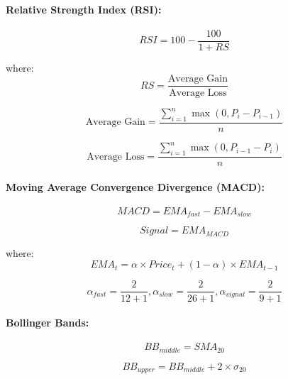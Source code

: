 \documentclass[conference]{IEEEtran}
\begin{document}
\paragraph{Relative Strength Index (RSI):}
\begin{equation}
RSI = 100 - \frac{100}{1 + RS}
\end{equation}

where:
\begin{equation}
RS = \frac{\text{Average Gain}}{\text{Average Loss}}
\end{equation}

\begin{equation}
\text{Average Gain} = \frac{\sum_{i=1}^n \max(0, P_i - P_{i-1})}{n}
\end{equation}

\begin{equation}
\text{Average Loss} = \frac{\sum_{i=1}^n \max(0, P_{i-1} - P_i)}{n}
\end{equation}

\paragraph{Moving Average Convergence Divergence (MACD):}
\begin{equation}
MACD = EMA_{fast} - EMA_{slow}
\end{equation}

\begin{equation}
Signal = EMA_{MACD}
\end{equation}

where:
\begin{equation}
EMA_t = \alpha \times Price_t + (1 - \alpha) \times EMA_{t-1}
\end{equation}

\begin{equation}
\alpha_{fast} = \frac{2}{12 + 1}, \alpha_{slow} = \frac{2}{26 + 1}, \alpha_{signal} = \frac{2}{9 + 1}
\end{equation}

\paragraph{Bollinger Bands:}
\begin{equation}
BB_{middle} = SMA_{20}
\end{equation}

\begin{equation}
BB_{upper} = BB_{middle} + 2 \times \sigma_{20}
\end{equation}
\end{document}

